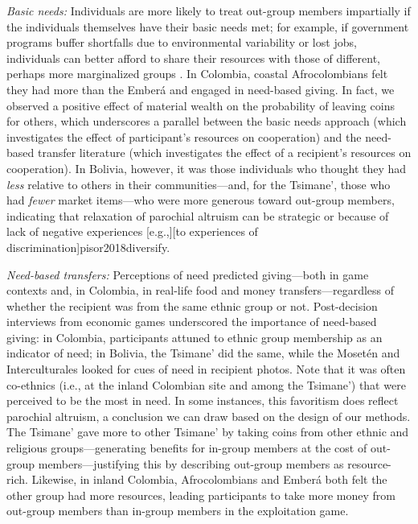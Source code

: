 \documentclass[bibauthoryear]{aa}
\begin{document}
\emph{Basic needs:} Individuals are more likely to treat out-group members impartially if the individuals themselves have their basic needs met; for example, if government programs buffer shortfalls due to environmental variability or lost jobs, individuals can better afford to share their resources with those of different, perhaps more marginalized groups  \citep{hruschka2014impartial, silva2014cooperation}. In Colombia, coastal Afrocolombians felt they had more than the Ember\'a and  engaged in need-based giving. In fact, we observed a positive effect of material wealth on the probability of leaving coins for others, which underscores a parallel between the basic needs approach (which investigates the effect of participant's resources on cooperation) and the need-based transfer literature (which investigates the effect of a recipient's resources on cooperation). In Bolivia, however, it was those individuals who thought they had \emph{less} relative to others in their communities---and, for the Tsimane', those who had \emph{fewer} market items---who were more generous toward out-group members, indicating that relaxation of parochial altruism can be strategic \citep[e.g.,][building between-group relationships]{pisor2016risk} or because of lack of negative experiences [e.g.,][to experiences of discrimination]{pisor2018diversify}.

\emph{Need-based transfers:} Perceptions of need predicted giving---both in game contexts and, in  Colombia, in real-life food and money transfers---regardless of whether the recipient was from the same ethnic group or not. Post-decision interviews from economic games underscored the importance of need-based giving: in Colombia, participants attuned to ethnic group membership as an indicator of need; in Bolivia, the Tsimane' did the same, while the Moset\'en and Interculturales looked for cues of need in recipient photos. Note that it was often co-ethnics (i.e., at the inland Colombian site and among the Tsimane') that were perceived to be the most in need. In some instances, this favoritism does reflect parochial altruism, a conclusion we can draw based on the design of our methods. The Tsimane' gave more to other Tsimane' by taking coins from other ethnic and religious groups---generating benefits for in-group members at the cost of out-group members---justifying this by describing out-group members as resource-rich. Likewise, in inland Colombia, Afrocolombians and Ember\'a both felt the other group had more resources, leading  participants to take more money from out-group members than in-group members in the exploitation game.  
\end{document}
